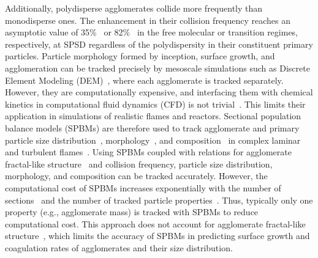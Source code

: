 
Additionally, polydisperse agglomerates collide more frequently than monodisperse ones. The enhancement in their collision frequency reaches an asymptotic value of 35\%~\citep{Goudeli2016} or 82\%~\citep{kelesidis2021self} in the free molecular or transition regimes, respectively, at SPSD regardless of the polydispersity in their constituent primary particles. Particle morphology formed by inception, surface growth, and agglomeration can be tracked precisely by mesoscale simulations such as Discrete Element Modeling (DEM)~\citep{Kelesidis2017Flame}, where each agglomerate is tracked separately. However, they are computationally expensive, and interfacing them with chemical kinetics in computational fluid dynamics (CFD) is not trivial~\citep{kelesidis2021perspective}. This limits their application in simulations of realistic flames and reactors. Sectional population balance models (SPBMs) are therefore used to track agglomerate and primary particle size distribution~\citep{Xiong1993}, morphology~\citep{park2005aerosol}, and composition~\citep{kholghy2016core} in complex laminar~\citep{kholghy2016core} and turbulent flames~\citep{schiener2019transported}. Using SPBMs coupled with relations for agglomerate fractal-like structure~\citep{matsoukas1991dynamics} and collision frequency, particle size distribution, morphology, and composition can be tracked accurately. However, the computational cost of SPBMs increases exponentially with the number of sections~\citep{Xiong1993} and the number of tracked particle properties~\citep{kholghy2016core}. Thus, typically only one property (e.g., agglomerate mass) is tracked with SPBMs to reduce computational cost. This approach does not account for agglomerate fractal-like structure~\citep{smooke2005soot, aubagnac2018soot}, which limits the accuracy of SPBMs in predicting surface growth and coagulation rates of agglomerates and their size distribution.



